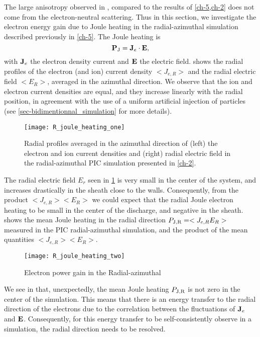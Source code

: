   The large anisotropy observed in , compared to the results of \cref{ch-5,ch-2} does not come from the electron-neutral scattering.
  Thus in this section, we investigate the electron energy gain due to Joule heating in the radial-azimuthal simulation described previously in \cref{ch-5}.
  The Joule heating is
  \begin{equation} \label{eq-epower}
      {\mathbf P_{\rm J}} = {\mathbf J_e} \cdot {\mathbf E},
  \end{equation}
  with ${\mathbf J_e}$ the electron density current and ${\mathbf E}$ the electric field.
   shows the radial profiles of the electron (and ion) current density $< J_{e, R}>$ and the radial electric field $ < E_R >$, averaged in the azimuthal direction.
  We observe that the ion and electron current densities are equal, and they increase linearly with the radial position, in agreement with the use of a uniform artificial injection of particles (see \cref{sec-bidimentionnal_simulation} for more details).

  \begin{figure}[hbt]
    \centering
    \texttt{[image: R\_joule\_heating\_one]}
    \caption{Radial profiles averaged in the azimuthal direction of (left) the electron and ion current densities and (right) radial electric field in the radial-azimuthal \acs{PIC} simulation presented in \cref{ch-2}. }
    \label{fig-epower_radialone}
  \end{figure}
  
  The radial electric field $E_r$ seen in \cref{fig-epower_radialone} is very small in the center of the system, and increases drastically in the sheath close to the walls.
  Consequently, from the product $< J_{e, R}>  < E_R >$ we could expect that the radial Joule electron heating to be small in the center of the discharge, and negative in the sheath.
   shows the mean Joule heating in the radial direction ${P_{\rm J, R}} = < J_{e, R} E_R >$ measured in the \ac{PIC} radial-azimuthal simulation, and the product of the mean quantities $< J_{e, R}>  < E_R >$.

  \begin{figure}[hbt]
    \centering
    \texttt{[image: R\_joule\_heating\_two]}
    \caption{Electron power gain in the Radial-azimuthal }
    \label{fig-epower_radial}
  \end{figure}

  We see in  that, unexpectedly,  the mean Joule heating ${P_{\rm J, R}}$ is not zero in the center of the simulation.
  This means that there is an energy transfer to the radial direction of the electrons due to the correlation between the fluctuations of ${\mathbf J_e}$ and ${\mathbf E}$.
  Consequently, for this energy transfer to be self-consistently observe in a simulation, the radial direction needs to be resolved.

